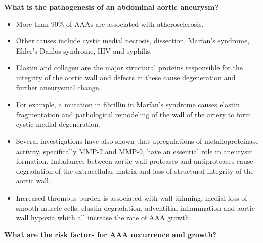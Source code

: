 \documentclass[
]{book}
\begin{document}
\textbf{What is the pathogenesis of an abdominal aortic aneurysm?}
\citep{mooreVascularEndovascularSurgery2019}

\begin{itemize}
\item
  More than 90\% of AAAs are associated with atherosclerosis.
\item
  Other causes include cystic medial necrosis, dissection, Marfan's
  syndrome, Ehler's-Danlos syndrome, HIV and syphilis.
\item
  Elastin and collagen are the major structural proteins responsible
  for the integrity of the aortic wall and defects in these cause
  degeneration and further aneurysmal change.
\item
  For example, a mutation in fibrillin in Marfan's syndrome causes
  elastin fragmentation and pathological remodeling of the wall of the
  artery to form cystic medial degeneration.
\item
  Several investigations have also shown that upregulations of
  metalloproteinase activity, specifically MMP-2 and MMP-9, have an
  essential role in aneurysm formation. Imbalances between aortic wall
  proteases and antiproteases cause degradation of the extracellular
  matrix and loss of structural integrity of the aortic wall.
\item
  Increased thrombus burden is associated with wall thinning, medial
  loss of smooth muscle cells, elastin degradation, adventitial
  inflammation and aortic wall hypoxia which all increase the rate of
  AAA growth.
\end{itemize}

\textbf{What are the risk factors for AAA occurrence and growth?}
\citep{mooreVascularEndovascularSurgery2019}
\end{document}
